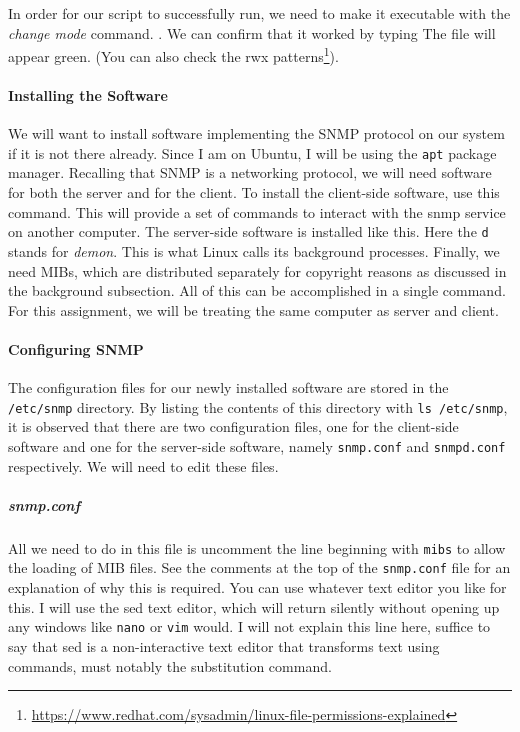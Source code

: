 \documentclass{article}
\begin{document}
In order for our script to successfully run, we need to make it executable with
the \emph{change mode} command. .  We can confirm that it worked by typing
 The file will appear
green.  (You can also check the rwx
%
patterns\footnote{%
	\url{https://www.redhat.com/sysadmin/linux-file-permissions-explained}}).

\paragraph{Installing the Software}

We will want to install software implementing the SNMP protocol on our system if
it is not there already.  Since I am on Ubuntu, I will be using the \verb|apt|
package manager.  Recalling that SNMP is a networking protocol, we will need
software for both the server and for the client. To install the client-side
software, use this command.
%
%
This will provide a set of commands to interact with the snmp service on another
computer.  The server-side software is installed like this.
%
%
Here the \verb|d| stands for \emph{demon}. This is what Linux calls its
background processes.
%
Finally, we need MIBs, which are distributed separately for copyright reasons as
discussed in the background subsection.
%
%
All of this can be accomplished in a single command.
%
%
For this assignment, we will be treating the same computer as server and client.

\paragraph{Configuring SNMP}

The configuration files for our newly installed software are stored in the
\verb|/etc/snmp| directory. By listing the contents of this directory with
\texttt{ls /etc/snmp}, it is observed that there are two configuration
files, one for the client-side software and one for the server-side software,
namely \verb|snmp.conf| and \verb|snmpd.conf| respectively.  We will need to
edit these files.

\subparagraph{snmp.conf}

All we need to do in this file is uncomment the line beginning with \verb|mibs|
to allow the loading of MIB files. See the comments at the top of the
\verb|snmp.conf| file for an explanation of why this is required. You can use
whatever text editor you like for this. I will use the sed text editor, which
will return silently without opening up any windows like \verb|nano| or
\verb|vim| would.
%
%
I will not explain this line here, suffice to say that sed is a non-interactive
text editor that transforms text using commands, must notably the substitution
command.
\end{document}
